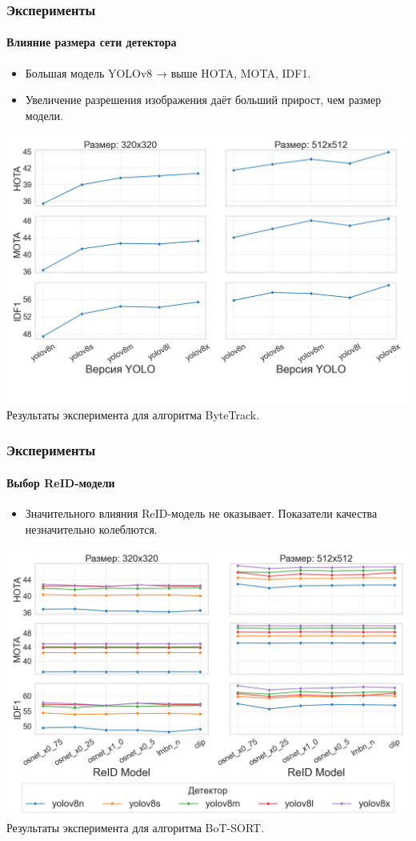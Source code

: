 \documentclass{beamer} %
\begin{document}
\begin{frame}
    \frametitle{Эксперименты}
    \framesubtitle{Влияние размера сети детектора}
    \begin{itemize}
      \item Большая модель YOLOv8 → выше HOTA, MOTA, IDF1.
      \item Увеличение разрешения изображения даёт больший прирост, чем размер модели.
    \end{itemize}
    \centering
    \includegraphics[width=0.7\linewidth]{images/plots/yolo_size_vs_metric/ByteTrack.png}\\
    \small Результаты эксперимента для алгоритма ByteTrack.
\end{frame}

\begin{frame}
  \frametitle{Эксперименты}
  \framesubtitle{Выбор ReID-модели}
  \begin{itemize}
    \item Значительного влияния ReID-модель не оказывает. Показатели качества незначительно колеблются.
  \end{itemize}
  \centering
  \includegraphics[width=0.7\linewidth]{images/plots/yolo_size_and_reid_vs_metric/BoT-SORT.png}\\
  \small Результаты эксперимента для алгоритма BoT-SORT.
\end{frame}
\end{document}
